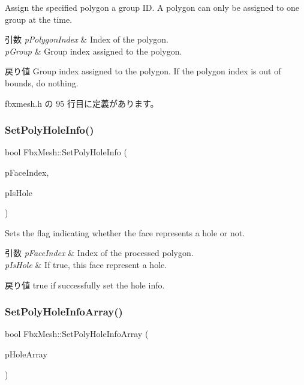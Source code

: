 Assign the specified polygon a group ID. A polygon can only be assigned to one group at the time. 
\begin{DoxyParams}{引数}
{\em p\+Polygon\+Index} & Index of the polygon. \\
\hline
{\em p\+Group} & Group index assigned to the polygon. \\
\hline
\end{DoxyParams}
\begin{DoxyReturn}{戻り値}
Group index assigned to the polygon. If the polygon index is out of bounds, do nothing. 
\end{DoxyReturn}


 fbxmesh.\+h の 95 行目に定義があります。

\mbox{\label{class_fbx_mesh_af13ce6ba20ce1920120a8b7b6d6854ed}} 
\subsubsection{\texorpdfstring{Set\+Poly\+Hole\+Info()}{SetPolyHoleInfo()}}
{\footnotesize\ttfamily bool Fbx\+Mesh\+::\+Set\+Poly\+Hole\+Info (\begin{DoxyParamCaption}\item[{int}]{p\+Face\+Index,  }\item[{bool}]{p\+Is\+Hole }\end{DoxyParamCaption})}

Sets the flag indicating whether the face represents a hole or not. 
\begin{DoxyParams}{引数}
{\em p\+Face\+Index} & Index of the processed polygon. \\
\hline
{\em p\+Is\+Hole} & If {\ttfamily true}, this face represent a hole. \\
\hline
\end{DoxyParams}
\begin{DoxyReturn}{戻り値}
{\ttfamily true} if successfully set the hole info. 
\end{DoxyReturn}
\mbox{\label{class_fbx_mesh_ae1392c998ffe508d66284c5615b17f15}} 
\subsubsection{\texorpdfstring{Set\+Poly\+Hole\+Info\+Array()}{SetPolyHoleInfoArray()}}
{\footnotesize\ttfamily bool Fbx\+Mesh\+::\+Set\+Poly\+Hole\+Info\+Array (\begin{DoxyParamCaption}\item[{\hyperlink{class_fbx_array}{Fbx\+Array}$<$ bool $>$ $\ast$}]{p\+Hole\+Array }\end{DoxyParamCaption})}

